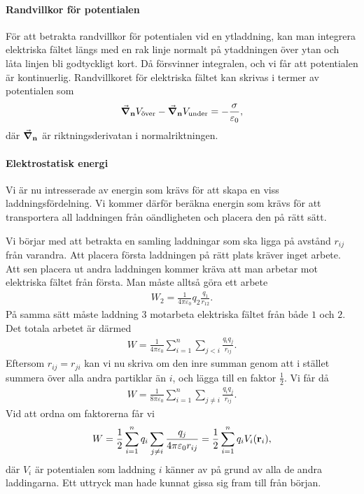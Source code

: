 \paragraph{Randvillkor för potentialen}
För att betrakta randvillkor för potentialen vid en ytladdning, kan man integrera elektriska fältet längs med en rak linje normalt på ytaddningen över ytan och låta linjen bli godtyckligt kort. Då försvinner integralen, och vi får att potentialen är kontinuerlig. Randvillkoret för elektriska fältet kan skrivas i termer av potentialen som
\begin{align*}
	\grad_{\vb{n}}V_{\text{över}} - \grad_{\vb{n}}V_{\text{under}} = -\frac{\sigma}{\varepsilon_{0}},
\end{align*}
där $\grad_{\vb{n}}$ är riktningsderivatan i normalriktningen.

\paragraph{Elektrostatisk energi}
Vi är nu intresserade av energin som krävs för att skapa en viss laddningsfördelning. Vi kommer därför beräkna energin som krävs för att transportera all laddningen från oändligheten och placera den på rätt sätt.

Vi börjar med att betrakta en samling laddningar som ska ligga på avstånd $r_{ij}$ från varandra. Att placera första laddningen på rätt plats kräver inget arbete. Att sen placera ut andra laddningen kommer kräva att man arbetar mot elektriska fältet från första. Man måste alltså göra ett arbete
\begin{align*}
	W_{2} = \frac{1}{4\pi\varepsilon_{0}}q_{2}\frac{q_{1}}{r_{12}}.
\end{align*}
På samma sätt måste laddning $3$ motarbeta elektriska fältet från både $1$ och $2$. Det totala arbetet är därmed
\begin{align*}
	W = \frac{1}{4\pi\varepsilon_{0}}\sum\limits_{i = 1}^{n}\sum\limits_{j < i}\frac{q_{i}q_{j}}{r_{ij}}.
\end{align*}
Eftersom $r_{ij} = r_{ji}$ kan vi nu skriva om den inre summan genom att i stället summera över alla andra partiklar än $i$, och lägga till en faktor $\frac{1}{2}$. Vi får då
\begin{align*}
	W = \frac{1}{8\pi\varepsilon_{0}}\sum\limits_{i = 1}^{n}\sum\limits_{j \neq i}\frac{q_{i}q_{j}}{r_{ij}}.
\end{align*}
Vid att ordna om faktorerna får vi
\begin{align*}
	W = \frac{1}{2}\sum\limits_{i = 1}^{n}q_{i}\sum\limits_{j \neq i}\frac{q_{j}}{4\pi\varepsilon_{0}r_{ij}} = \frac{1}{2}\sum\limits_{i = 1}^{n}q_{i}V_{i}(\vb{r}_{i}),
\end{align*}
där $V_{i}$ är potentialen som laddning $i$ känner av på grund av alla de andra laddingarna. Ett uttryck man hade kunnat gissa sig fram till från början.

